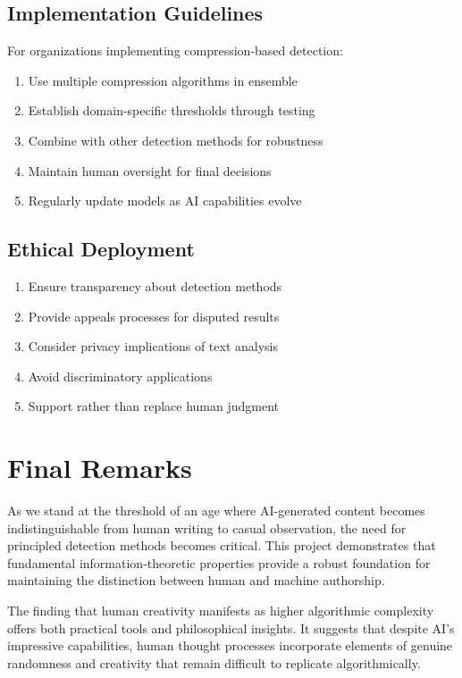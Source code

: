 \documentclass[12pt,a4paper]{report}
\begin{document}
\subsection{Implementation Guidelines}

For organizations implementing compression-based detection:
\begin{enumerate}
    \item Use multiple compression algorithms in ensemble
    \item Establish domain-specific thresholds through testing
    \item Combine with other detection methods for robustness
    \item Maintain human oversight for final decisions
    \item Regularly update models as AI capabilities evolve
\end{enumerate}

\subsection{Ethical Deployment}

\begin{enumerate}
    \item Ensure transparency about detection methods
    \item Provide appeals processes for disputed results
    \item Consider privacy implications of text analysis
    \item Avoid discriminatory applications
    \item Support rather than replace human judgment
\end{enumerate}


\section{Final Remarks}

As we stand at the threshold of an age where AI-generated content becomes indistinguishable from human writing to casual observation, the need for principled detection methods becomes critical. This project demonstrates that fundamental information-theoretic properties provide a robust foundation for maintaining the distinction between human and machine authorship.

The finding that human creativity manifests as higher algorithmic complexity offers both practical tools and philosophical insights. It suggests that despite AI's impressive capabilities, human thought processes incorporate elements of genuine randomness and creativity that remain difficult to replicate algorithmically.
\end{document}
